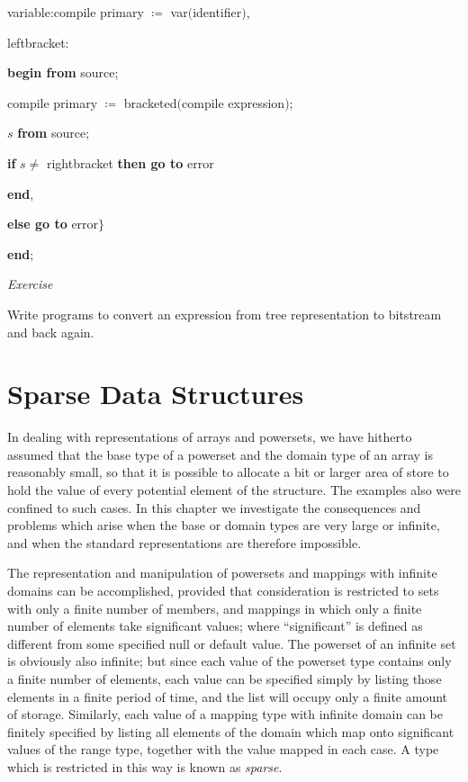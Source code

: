 \documentclass[twoside,11pt]{book}
\begin{document}
\noindent
\quad \quad \quad variable:compile primary $\coloneq$ var$($identifier$)$,

\noindent
\quad \quad \quad leftbracket:

\noindent
\quad \quad \quad \textbf{begin from} source;

\noindent
\quad \quad \quad \quad compile primary $\coloneq$ bracketed$($compile expression$)$;

\noindent
\quad \quad \quad \quad $s$ \textbf{from} source;

\noindent
\quad \quad \quad \quad \textbf{if} $s \neq$ rightbracket \textbf{then go to} error

\noindent
\quad \quad \quad \textbf{end},

\noindent
\quad \quad \textbf{else go to} error$\}$

\noindent
\quad \textbf{end};

\noindent
\textit{Exercise}
\nopagebreak

\noindent
Write programs to convert an expression from tree representation to bitstream and back again.

\section[Sparse data structures]{Sparse Data Structures}
\label{sec:sparse-data-structures}

In dealing with representations of arrays and powersets, we have hitherto assumed that the base type of a powerset and the domain type of an array is reasonably small, so that it is possible to allocate a bit or larger area of store to hold the value of every potential element of the structure. The examples also were confined to such cases. In this chapter we investigate the consequences and problems which arise when the base or domain types are very large or infinite, and when the standard representations are therefore impossible.

The representation and manipulation of powersets and mappings with infinite domains can be accomplished, provided that consideration is restricted to sets with only a finite number of members, and mappings in which only a finite number of elements take significant values; where ``significant'' is defined as different from some specified null or default value. The powerset of an infinite set is obviously also infinite; but since each value of the powerset type contains only a finite number of elements, each value can be specified simply by listing those elements in a finite period of time, and the list will occupy only a finite amount of storage. Similarly, each value of a mapping type with infinite domain can be finitely specified by listing all elements of the domain which map onto significant values of the range type, together with the value mapped in each case. A type which is restricted in this way is known as \textit{sparse}.
\end{document}
